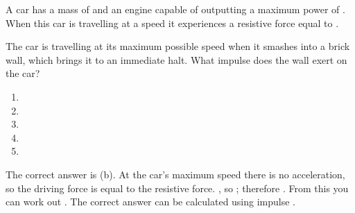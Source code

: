 
\begin{problem}
{A car has a mass of  and an engine capable of outputting a maximum power of . When this car is travelling at a speed  it experiences a resistive force equal to .

The car is travelling at its maximum possible speed when it smashes into a brick wall, which brings it to an immediate halt. What impulse does the wall exert on the car?
\begin{enumerate}
	\item {}
	\item {}\answer
	\item {} 
	\item {}
	\item {}
\end{enumerate}
}
{}
{The correct answer is (b). At the car's maximum speed there is no acceleration, so the driving force is equal to the resistive force. , so ; therefore . From this you can work out . The correct answer can be calculated using impulse .
}
\end{problem}


